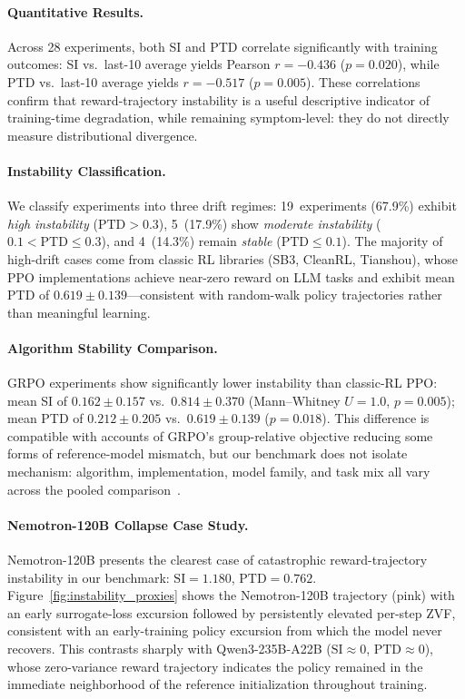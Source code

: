 \documentclass{article}
\begin{document}
\paragraph{Quantitative Results.}
Across 28 experiments, both SI and PTD correlate significantly with
training outcomes:
SI vs.\ last-10 average yields Pearson $r = -0.436$ ($p = 0.020$),
while PTD vs.\ last-10 average yields $r = -0.517$ ($p = 0.005$).
These correlations confirm that reward-trajectory instability is a useful
descriptive indicator of training-time degradation, while remaining
symptom-level: they do not directly measure distributional divergence.

\paragraph{Instability Classification.}
We classify experiments into three drift regimes:
19~experiments (67.9\%) exhibit \emph{high instability}
($\text{PTD} > 0.3$), 5~(17.9\%) show \emph{moderate instability}
($0.1 < \text{PTD} \leq 0.3$), and 4~(14.3\%) remain \emph{stable}
($\text{PTD} \leq 0.1$). The majority of high-drift cases come from
classic RL libraries (SB3, CleanRL, Tianshou), whose PPO
implementations achieve near-zero reward on LLM tasks and exhibit
mean PTD of $0.619 \pm 0.139$---consistent with random-walk policy
trajectories rather than meaningful learning.

\paragraph{Algorithm Stability Comparison.}
GRPO experiments show significantly lower instability than classic-RL PPO:
mean SI of $0.162 \pm 0.157$ vs.\ $0.814 \pm 0.370$
(Mann--Whitney $U = 1.0$, $p = 0.005$); mean PTD of $0.212 \pm 0.205$
vs.\ $0.619 \pm 0.139$ ($p = 0.018$).
This difference is compatible with accounts of GRPO's group-relative
objective reducing some forms of reference-model mismatch, but our benchmark
does not isolate mechanism: algorithm, implementation, model family, and task
mix all vary across the pooled comparison~\citep{shao2024deepseekmath}.

\paragraph{Nemotron-120B Collapse Case Study.}
Nemotron-120B presents the clearest case of catastrophic reward-trajectory instability
in our benchmark: $\text{SI} = 1.180$, $\text{PTD} = 0.762$.
Figure~\ref{fig:instability_proxies} shows the Nemotron-120B trajectory
(pink) with an early surrogate-loss excursion followed by persistently
elevated per-step ZVF, consistent with an early-training policy
excursion from which the model never recovers. This contrasts sharply with Qwen3-235B-A22B
($\text{SI} \approx 0$, $\text{PTD} \approx 0$), whose zero-variance
reward trajectory indicates the policy remained in the immediate
neighborhood of the reference initialization throughout training.
\end{document}
